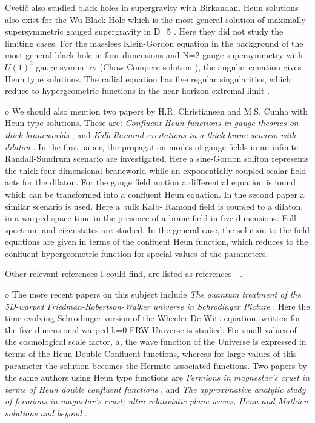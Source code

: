 \documentclass{article}
\begin{document}
\noindent Cveti\v{c} also studied black holes in supergravity with
Birkandan. Heun solutions also exist for the Wu Black Hole which
is the most general solution of maximally supersymmetric gauged
supergravity in D=5 \cite {Birkandan}. Here they did not study the
limiting cases.
 For the
massless Klein-Gordon equation in the background of the most
general black hole in four dimensions and N=2 gauge supersymmetry
with $U(1)^2$ gauge symmetry  (Chow-Compere solution \cite
{Chow}), the angular equation gives Heun type solutions. The
radial equation has five regular singularities, which reduce to
hypergeometric functions in the near horizon extremal limit \cite
{Birkandan1}.

o We should also mention two papers by H.R. Christiansen and M.S.
Cunha with Heun type solutions. These are: \emph{Confluent Heun
functions in gauge theories on thick braneworlds} \cite{Cunha1},
and  \emph{Kalb-Ramond excitations in a thick-brane scnario with
dilaton} \cite{Cunha2}. In the first paper, the propagation modes
of gauge fields in an infinite Randall-Sundrum scenario are
investigated. Here a sine-Gordon soliton represents the thick four
dimensional braneworld while an exponentially coupled scalar field
acts for the dilaton. For the gauge field motion a differential
equation is found which can be transformed into a confluent Heun
equation.  In the second paper a similar scenario is used. Here a
bulk Kalb- Ramond field is coupled to a dilaton, in a warped
space-time in the presence of a brane field in five dimensions.
Full spectrum and eigenstates are studied.  In the general case,
the solution to the field equations are given in terms of the
confluent Heun function, which reduces to the confluent
hypergeometric function for special values of the parameters.

\noindent Other relevant references I could find, are listed as
references \cite {siopsis} - \cite {Yoshida}.

\noindent o  The more recent papers on this subject include \emph{
The quantum treatment of the 5D-warped Friedman-Robertson-Walker
universe in Schrodinger Picture }\cite {Dariescu}. Here the
time-evolving Schrodinger version of the Wheeler-De Witt equation,
written for the five dimensional warped k=0-FRW Universe is
studied. For small values of the cosmological scale factor, $a$,
the wave function of the Universe is expressed in terms of the
Heun Double Confluent functions, whereas for large  values of this
parameter the solution becomes the Hermite associated functions.
Two papers by the same authors using Heun type functions are
\emph{Fermions in magnestar's crust in terms of Heun double
confluent functions} \cite{Dariescu1}, and \emph{The approximative
analytic study of fermions in magnetar's crust; ultra-relativistic
plane waves, Heun and Mathieu solutions and beyond }
\cite{Dariescu2}.
\end{document}
